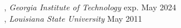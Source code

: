 
, \textit{Georgia Institute of Technology}	\hfill exp. May 2024 \\
, \textit{Louisiana State University} \hfill	May 2011 \\

